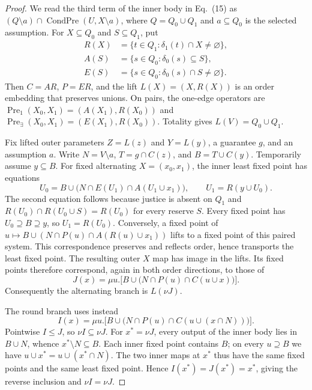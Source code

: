 \documentclass[11pt]{article}
\begin{document}
\begin{proof}
We read the third term of the inner body in Eq.~(15) as
$(Q\setminus a)\cap\operatorname{CondPre}(U,X\setminus a)$,
where $Q=Q_0\cup Q_1$ and $a\subseteq Q_0$ is the selected assumption.
For $X\subseteq Q_0$ and $S\subseteq Q_1$, put
\[
\begin{aligned}
 R(X)&=\{t\in Q_1:\delta_1(t)\cap X\ne\varnothing\},\\
 A(S)&=\{s\in Q_0:\delta_0(s)\subseteq S\},\\
 E(S)&=\{s\in Q_0:\delta_0(s)\cap S\ne\varnothing\}.
\end{aligned}
\]
Then $C=AR$, $P=ER$, and the lift $L(X)=(X,R(X))$ is an order embedding
that preserves unions. On pairs, the one-edge operators are
$\operatorname{Pre}_1(X_0,X_1)=(A(X_1),R(X_0))$ and
$\operatorname{Pre}_{\exists}(X_0,X_1)=(E(X_1),R(X_0))$.
Totality gives $L(V)=Q_0\cup Q_1$.

Fix lifted outer parameters $Z=L(z)$ and $Y=L(y)$, a guarantee $g$,
and an assumption $a$. Write $N=V\setminus a$, $T=g\cap C(z)$, and
$B=T\cup C(y)$. Temporarily assume $y\subseteq B$.
For fixed alternating $X=(x_0,x_1)$, the inner least fixed point has equations
\[
 U_0=B\cup\bigl(N\cap E(U_1)\cap A(U_1\cup x_1)\bigr),\qquad
 U_1=R(y\cup U_0).
\]
The second equation follows because justice is absent on $Q_1$ and
$R(U_0)\cap R(U_0\cup S)=R(U_0)$ for every reserve $S$.
Every fixed point has $U_0\supseteq B\supseteq y$, so $U_1=R(U_0)$.
Conversely, a fixed point of
$u\mapsto B\cup(N\cap P(u)\cap A(R(u)\cup x_1))$
lifts to a fixed point of this paired system. This correspondence
preserves and reflects order, hence transports the least fixed point.
The resulting outer $X$ map has image in the lifts. Its fixed points
therefore correspond, again in both order directions, to those of
\[
 J(x)=\mu u.\bigl[B\cup\bigl(N\cap P(u)\cap C(u\cup x)\bigr)\bigr].
\]
Consequently the alternating branch is $L(\nu J)$.

The round branch uses instead
\[
 I(x)=\mu u.\bigl[B\cup\bigl(N\cap P(u)\cap C(u\cup(x\cap N))\bigr)\bigr].
\]
Pointwise $I\le J$, so $\nu I\subseteq\nu J$. For $x^*=\nu J$,
every output of the inner body lies in $B\cup N$, whence
$x^*\setminus N\subseteq B$. Each inner fixed point contains $B$;
on every $u\supseteq B$ we have
$u\cup x^*=u\cup(x^*\cap N)$.
The two inner maps at $x^*$ thus have the same fixed points and the
same least fixed point. Hence $I(x^*)=J(x^*)=x^*$, giving the reverse
inclusion and $\nu I=\nu J$.


\end{proof}
\end{document}
